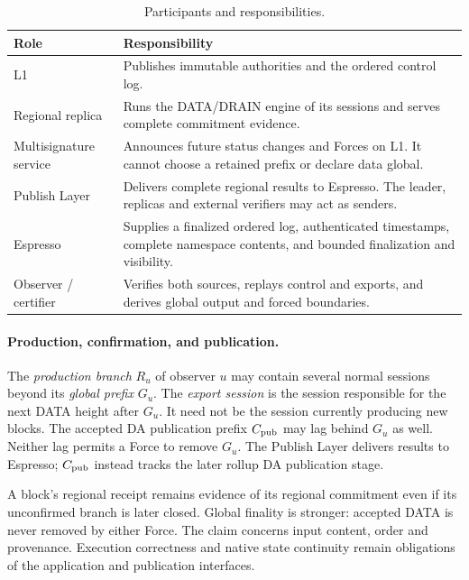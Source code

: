 \documentclass[11pt,a4paper]{article}
\newcommand{\defterm}[1]{\textcolor{rrBlue}{\textit{#1}}}
\begin{document}
\begin{table}[htbp]\centering\small
\caption{Participants and responsibilities.}\label{tab:roles}
\begin{tabularx}{\linewidth}{@{}>{\raggedright\arraybackslash}p{.19\linewidth}Y@{}}\toprule
Role & Responsibility\\\midrule
L1 & Publishes immutable authorities and the ordered control log.\\
Regional replica & Runs the DATA/DRAIN engine of its sessions and
serves complete commitment evidence.\\
Multisignature service & Announces future status changes and Forces
on L1. It cannot choose a retained prefix or declare data global.\\
Publish Layer & Delivers complete regional results to Espresso. The
leader, replicas and external verifiers may act as senders.\\
Espresso & Supplies a finalized ordered log, authenticated timestamps,
complete namespace contents, and bounded finalization and visibility.\\
Observer / certifier & Verifies both sources, replays control and
exports, and derives global output and forced boundaries.\\
\bottomrule
\end{tabularx}
\end{table}

\paragraph{Production, confirmation, and publication.}
The \defterm{production branch} $R_u$ of observer $u$ may contain
several normal sessions beyond its \defterm{global prefix} $G_u$.
The \defterm{export session} is the session responsible for the next
DATA height after $G_u$. It need not be the session currently producing
new blocks. The accepted DA publication prefix $C_{\rm pub}$ may lag
behind $G_u$ as well. Neither lag permits a Force to remove $G_u$.
The Publish Layer delivers results to Espresso; $C_{\rm pub}$ instead
tracks the later rollup DA publication stage.

A block's regional receipt remains evidence of its regional commitment
even if its unconfirmed branch is later closed. Global finality is
stronger: accepted DATA is never removed by either Force.
The claim concerns input content, order and provenance. Execution
correctness and native state continuity remain obligations of the
application and publication interfaces.
\end{document}
